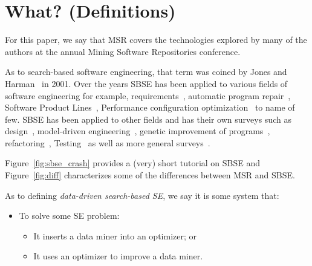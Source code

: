 \documentclass[sigconf,anonymous,review]{acmart}
\newcommand\TODO[1]{\textcolor{ScarletRed}{\textbf{\colorbox{yellow}{\small TODO:}} \emph{#1}}\xspace}
\begin{document}


\section{What? (Definitions)}

For this paper, we say that MSR covers the technologies
explored by many of the authors at the annual Mining Software Repositories
conference.

As to search-based software engineering, that term was coined by Jones and Harman~\cite{harman2001search} in 2001.
Over the years SBSE has been applied to various fields of software engineering for example, requirements~\cite{ZhangHL13, chen2017beyond}, automatic program repair~\cite{le2012genprog}, Software Product Lines~\cite{chen2017sampling, sayyad13a, guo2017smtibea}, Performance configuration optimization~\cite{nair2017faster,nair2017using, guo2017data, oh2017finding, nair2018finding} to name of few. SBSE has been applied to other fields and has their own surveys such as design~\cite{raiha2010survey}, model-driven engineering~\cite{boussaid2017survey}, genetic improvement of programs~\cite{petke2017genetic}, refactoring~\cite{mariani2017systematic}, Testing~\cite{silva2017systematic, khari2017extensive} as well as more general surveys~\cite{clarke2003reformulating, harman2007current}. 

 Figure~\ref{fig:sbse_crash} provides a (very) short tutorial on SBSE and  Figure~\ref{fig:diff} characterizes some of the differences between MSR 
and SBSE.
 
As to defining {\em data-driven search-based SE},
we say it is some system that:
\begin{itemize}[leftmargin=*]
\item To solve  some SE problem:
\begin{itemize}
\item
It inserts  a data miner into an optimizer; or
\item
It uses an optimizer  to improve a data  miner.
\end{itemize}
\end{itemize}
\end{document}
